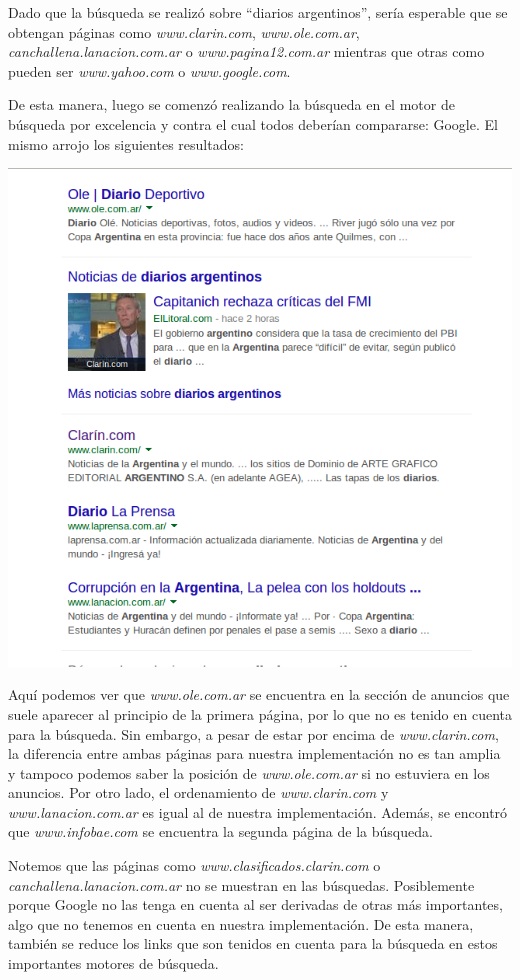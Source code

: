 Dado que la búsqueda se realizó sobre ``diarios argentinos'', sería esperable que se obtengan páginas como \textit{www.clarin.com}, \textit{www.ole.com.ar}, \textit{canchallena.lanacion.com.ar} o \textit{www.pagina12.com.ar} mientras que otras como pueden ser \textit{www.yahoo.com} o \textit{www.google.com}. 
\par 
De esta manera, luego se comenzó realizando la búsqueda en el motor de búsqueda por excelencia y contra el cual todos deberían compararse: Google.
El mismo arrojo los siguientes resultados:

	\par 
	\begin{center}
		\includegraphics[scale=0.5]{./img/primerapaginagoogle.png}
	\end{center}
	\par 

Aquí podemos ver que \textit{www.ole.com.ar} se encuentra en la sección de anuncios que suele aparecer al principio de la primera página, por lo que no es tenido en cuenta para la búsqueda. Sin embargo, a pesar de estar por encima de \textit{www.clarin.com}, la diferencia entre ambas páginas para nuestra implementación no es tan amplia y tampoco podemos saber la posición de \textit{www.ole.com.ar} si no estuviera en los anuncios. Por otro lado, el ordenamiento de \textit{www.clarin.com} y \textit{www.lanacion.com.ar} es igual al de nuestra implementación. Además, se encontró que \textit{www.infobae.com} se encuentra la segunda página de la búsqueda. 
\par 
Notemos que las páginas como \textit{www.clasificados.clarin.com} o \textit{canchallena.lanacion.com.ar} no se muestran en las búsquedas. Posiblemente porque Google no las tenga en cuenta al ser derivadas de otras más importantes, algo que no tenemos en cuenta en nuestra implementación.  De esta manera, también se reduce los links que son tenidos en cuenta para la búsqueda en estos importantes motores de búsqueda.
\par 

